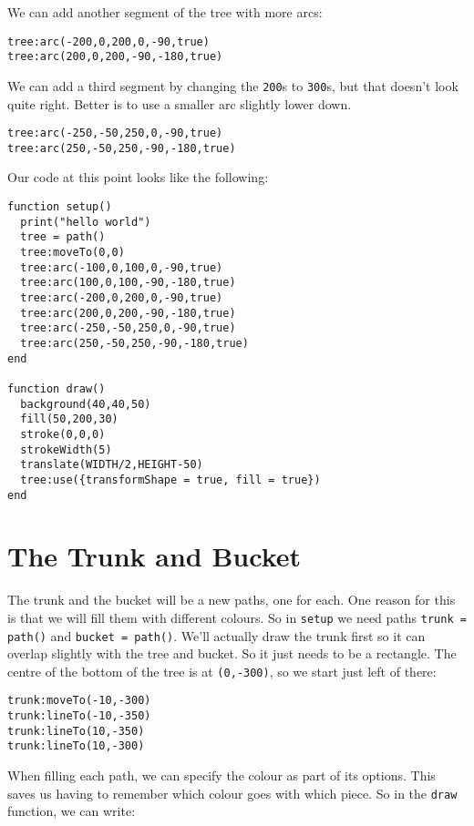 \documentclass[
  xhtml,%
  use filename%
]{internet}
\begin{document}
We can add another segment of the tree with more arcs:

\begin{verbatim}
tree:arc(-200,0,200,0,-90,true)
tree:arc(200,0,200,-90,-180,true)
\end{verbatim}

We can add a third segment by changing the \verb+200+s to \verb+300+s, but that doesn't look quite right.
Better is to use a smaller arc slightly lower down.

\begin{verbatim}
tree:arc(-250,-50,250,0,-90,true)
tree:arc(250,-50,250,-90,-180,true)
\end{verbatim}

Our code at this point looks like the following:

\begin{verbatim}
function setup()
  print("hello world")
  tree = path()
  tree:moveTo(0,0)
  tree:arc(-100,0,100,0,-90,true)
  tree:arc(100,0,100,-90,-180,true)
  tree:arc(-200,0,200,0,-90,true)
  tree:arc(200,0,200,-90,-180,true)
  tree:arc(-250,-50,250,0,-90,true)
  tree:arc(250,-50,250,-90,-180,true)
end

function draw()
  background(40,40,50)
  fill(50,200,30)
  stroke(0,0,0)
  strokeWidth(5)
  translate(WIDTH/2,HEIGHT-50)
  tree:use({transformShape = true, fill = true})
end
\end{verbatim}

\section{The Trunk and Bucket}

The trunk and the bucket will be a new paths, one for each.
One reason for this is that we will fill them with different colours.
So in \verb+setup+ we need paths \verb+trunk = path()+ and \verb+bucket = path()+.
We'll actually draw the trunk first so it can overlap slightly with the tree and bucket.
So it just needs to be a rectangle.
The centre of the bottom of the tree is at \verb+(0,-300)+, so we start just left of there:

\begin{verbatim}
trunk:moveTo(-10,-300)
trunk:lineTo(-10,-350)
trunk:lineTo(10,-350)
trunk:lineTo(10,-300)
\end{verbatim}

When filling each path, we can specify the colour as part of its options.
This saves us having to remember which colour goes with which piece.
So in the \verb+draw+ function, we can write:
\end{document}

